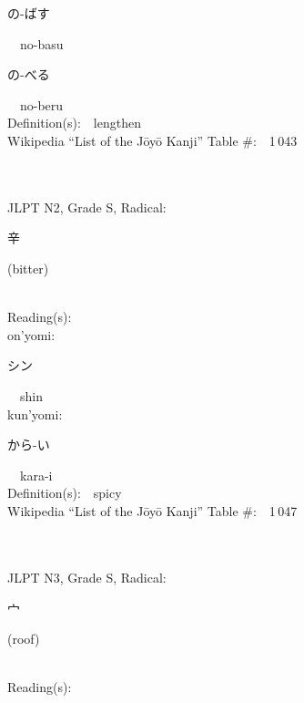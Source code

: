 \begin{multicols}{2}
{\hspace*{2em}}{\begin{CJK}{UTF8}{min} の-ばす \end{CJK}}\ \ no-basu\ \ \\
{\hspace*{2em}}{\begin{CJK}{UTF8}{min} の-べる \end{CJK}}\ \ no-beru\ \ \\
Definition(s):\ \ lengthen \\
Wikipedia ``List of the J\=oy\=o Kanji'' Table \#:\ \ 1\,043 \\
\ \ \\
{\fontsize{34pt}{40pt}  }\ \ \\  %
{JLPT N2, Grade S, Radical:\ \ {\begin{CJK}{UTF8}{min} 辛 \end{CJK}} (bitter) } \\
Reading(s):\ \ \\
{\hspace*{1em}}on'yomi:\ \ \\
{\hspace*{2em}}{\begin{CJK}{UTF8}{min} シン \end{CJK}}\ \ shin\ \ \\
{\hspace*{1em}}kun'yomi:\ \ \\
{\hspace*{2em}}{\begin{CJK}{UTF8}{min} から-い \end{CJK}}\ \ kara-i\ \ \\
Definition(s):\ \ spicy \\
Wikipedia ``List of the J\=oy\=o Kanji'' Table \#:\ \ 1\,047 \\
\ \ \\
{\fontsize{34pt}{40pt}  }\ \ \\  %
{JLPT N3, Grade S, Radical:\ \ {\begin{CJK}{UTF8}{min} 宀 \end{CJK}} (roof) } \\
Reading(s):\ \ \\

\end{multicols}
